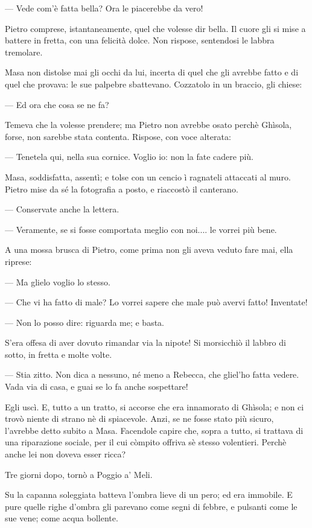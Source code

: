 — Vede com'è fatta bella? Ora le piacerebbe da vero!

Pietro comprese, istantaneamente, quel che volesse dir bella. Il cuore gli si mise a battere in fretta, con una felicità dolce. Non rispose, sentendosi le labbra tremolare.

Masa non distolse mai gli occhi da lui, incerta di quel che gli avrebbe fatto e di quel che provava: le sue palpebre sbattevano. Cozzatolo in un braccio, gli chiese:

— Ed ora che cosa se ne fa?

Temeva che la volesse prendere; ma Pietro non avrebbe osato perchè Ghìsola, forse, non sarebbe stata contenta. Rispose, con voce alterata:

— Tenetela qui, nella sua cornice. Voglio io: non la fate cadere più.

Masa, soddisfatta, assentì; e tolse con un cencio ì ragnateli attaccati al muro. Pietro mise da sé la fotografia a posto, e riaccostò il canterano.

— Conservate anche la lettera.

— Veramente, se si fosse comportata meglio con noi.... le vorrei più bene.

A una mossa brusca di Pietro, come prima non gli aveva veduto fare mai, ella riprese:

— Ma glielo voglio lo stesso.

— Che vi ha fatto di male? Lo vorrei sapere che male può avervi fatto! Inventate!

— Non lo posso dire: riguarda me; e basta.

S'era offesa di aver dovuto rimandar via la nipote! Si morsicchiò il labbro di sotto, in fretta e molte volte.

— Stia zitto. Non dica a nessuno, né meno a Rebecca, che gliel'ho fatta vedere. Vada via di casa, e guai se lo fa anche sospettare!

Egli uscì. E, tutto a un tratto, si accorse che era innamorato di Ghìsola; e non ci trovò niente di strano nè di spiacevole. Anzi, se ne fosse stato più sicuro, l'avrebbe detto subito a Masa. Facendole capire che, sopra a tutto, si trattava di una riparazione sociale, per il cui còmpito offriva sè stesso volentieri. Perchè anche lei non doveva esser ricca?

Tre giorni dopo, tornò a Poggio a' Meli.

Su la capanna soleggiata batteva l'ombra lieve di un pero; ed era immobile. E pure quelle righe d'ombra gli parevano come segni di febbre, e pulsanti come le sue vene; come acqua bollente.

